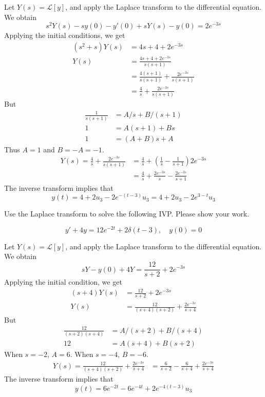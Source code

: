     \ifnum {} {\color{DarkBlue} 
    Let $Y (s) = \mathcal L[y]$, and apply the Laplace transform to the differential equation. We obtain
    $$s^2 Y (s) - sy(0) - y' (0) + sY (s) - y(0) = 2e^{-3s} $$
    Applying the initial conditions, we get
    \begin{align}
    (s^2 + s)Y(s) &= 4s+4 + 2e^{-3 s} \\
        Y(s) 
        &=  \frac{4s+4 + 2e^{-3 s} }{s(s+1)} \\ 
        &=  \frac{4(s+1) }{s(s+1)} + \frac{2e^{-3 s} }{s(s+1)} \\ 
        &=  \frac{4 }{s} + \frac{2e^{-3 s} }{s(s+1)} 
    \end{align}
    But 
    \begin{align}
        \frac{1}{s(s+1)} &= A/s + B/(s+1) \\
        1 &= A(s+1) + Bs \\
        1 &= (A+B)s + A
    \end{align}
    Thus $A=1$ and $B=-A=-1$. 
    \begin{align}
        Y(s) 
        =  \frac{4 }{s} + \frac{2e^{-3 s} }{s(s+1)} 
        &=  \frac{4 }{s} + \left(\frac{1}{s} - \frac{1}{s+1}\right)2e^{-3 s} \\ 
        &=  \frac{4 }{s} + \frac{2e^{-3s}}{s} - \frac{2e^{-3 s}}{s+1} 
    \end{align}    
    The inverse transform implies that
    $$y(t) = 4 + 2u_{3}-2e^{-(t-3)}u_3 = 4 + 2u_{3}-2e^{3-t}u_3$$ 
    
    } 
    \else 
    \fi
\fi




\ifnum {}
\ifnum {} \newpage \fi
\question[5] Use the Laplace transform to solve the following IVP. Please show your work. 

    $$ y' + 4y =  12e^{-2t} + 2\delta(t - 3), \quad y(0) = 0$$  

    \ifnum {} {\color{DarkBlue} 
    Let $Y (s) = \mathcal L[y]$, and apply the Laplace transform to the differential equation. We obtain
    $$sY- y(0) + 4Y= \frac{12}{s+2} + 2e^{-3s} $$
    Applying the initial condition, we get
    \begin{align}
    (s + 4)Y(s) &= \frac{12}{s+2} + 2e^{-3 s} \\
        Y(s) 
        &=  \frac{12}{(s+4)(s+2)} + \frac{2e^{-3 s}}{s+4}
    \end{align}
    But 
    \begin{align}
        \frac{12}{(s+2)(s+4)} &= A/(s+2) + B/(s+4) \\
        12 &= A(s+4) + B(s+2) 
    \end{align}
    When $s=-2$, $A=6$. When $s=-4$, $B=-6$. 
    \begin{align}
        Y(s) 
        =  \frac{12}{(s+4)(s+2)} + \frac{2e^{-3 s}}{s+4} 
        &= \frac{6}{s+2} - \frac{6}{s+4} + \frac{2e^{-3 s}}{s+4}
    \end{align}    
    The inverse transform implies that
    $$y(t) = 6e^{-2t} - 6 e^{-4t} + 2e^{-4(t-3)}u_3$$
    
    } 
    \else 
    \fi
\fi


